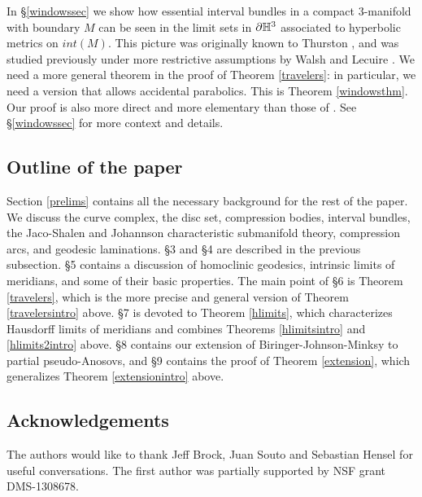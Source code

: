 \documentclass[12pt]{amsart}
\theoremstyle{definition}
\theoremstyle{remark}
\begin{document}
In \S\ref{windowssec} we show how essential interval bundles in a compact $3$-manifold with boundary $M$ can be seen in the limit sets in $\partial \mathbb H^3$ associated to hyperbolic metrics on $int(M)$. This picture was originally known to Thurston \cite{Thurstonhyperbolic3}, and was studied previously under more restrictive assumptions by Walsh \cite{walsh2014bumping} and Lecuire \cite{lecuire2004structures}. We need a more general theorem in the proof of Theorem \ref{travelers}: in particular, we need a version that allows accidental parabolics. This is Theorem \ref{windowsthm}. Our proof is also more direct and more elementary than those of \cite{walsh2014bumping,lecuire2004structures}. See \S\ref{windowssec}  for more context and details.

\subsection{Outline of the paper}

Section \ref{prelims} contains all the necessary background for the rest of the paper. We discuss the curve complex, the disc set, compression bodies, interval bundles, the Jaco-Shalen and Johannson characteristic submanifold theory, compression arcs, and geodesic laminations. \S 3 and \S 4 are described in the previous subsection. \S 5 contains a discussion of homoclinic geodesics, intrinsic limits of meridians, and some of their basic properties. The main point of \S 6 is Theorem  \ref{travelers}, which is the more precise and general version of Theorem \ref{travelersintro} above. \S 7 is devoted to Theorem \ref{hlimits}, which characterizes Hausdorff limits of meridians and combines Theorems \ref{hlimitsintro} and \ref{hlimits2intro} above. \S 8 contains our extension of Biringer-Johnson-Minksy \cite{Biringerextending} to partial pseudo-Anosovs, and \S 9 contains the proof of Theorem \ref{extension}, which generalizes Theorem \ref{extensionintro} above.

  \vspace{1mm}
  
    \subsection{Acknowledgements}
  
The authors would like to thank Jeff Brock, Juan Souto and Sebastian Hensel for useful conversations.  The first author was partially supported by NSF grant DMS-1308678. 
\end{document}
